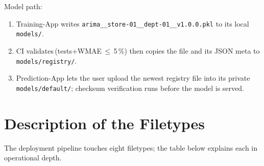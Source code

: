 Model path:
\begin{enumerate}
	\item Training-App writes \verb|arima__store-01__dept-01__v1.0.0.pkl| to its local \texttt{models/}.
	\item CI validates\,(tests+WMAE\,$\le$\,5\,\%) then copies the file and its JSON meta to \texttt{models/registry/}.
	\item Prediction-App lets the user upload the newest registry file into its private \texttt{models/default/}; checksum verification runs before the model is served.
\end{enumerate}

\section{Description of the Filetypes} %

The deployment pipeline touches eight filetypes; the table below explains each in operational depth.

